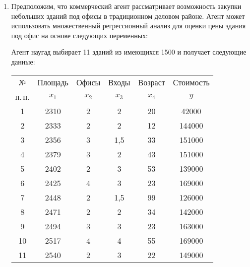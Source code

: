 \documentclass[a4paper,12pt]{extarticle}
\begin{document}
\begin{enumerate}
    \item 
    Предположим, что коммерческий агент рассматривает возможность закупки небольших зданий под офисы в традиционном деловом районе. Агент может использовать множественный регрессионный анализ для оценки цены здания под офис на основе следующих переменных:
    Агент наугад выбирает 11 зданий из имеющихся 1500 и получает следующие данные:
    \par{\centering \begin{tabular}{cccccc}
        \hline
        №     & Площадь & Офисы & Входы & Возраст & Стоимость \\      
        п.\,п.& $x_1$& $x_2$ & $x_3$ & $x_4$ & $y$    \\      
        \hline
        1     & 2310 & 2     & 2     & 20    & 42000  \\
        2     & 2333 & 2     & 2     & 12    & 144000 \\
        3     & 2356 & 3     & 1,5   & 33    & 151000 \\
        4     & 2379 & 3     & 2     & 43    & 151000 \\
        5     & 2402 & 2     & 3     & 53    & 139000 \\
        6     & 2425 & 4     & 3     & 23    & 169000 \\
        7     & 2448 & 2     & 1,5   & 99    & 126000 \\
        8     & 2471 & 2     & 2     & 34    & 142000 \\
        9     & 2494 & 3     & 3     & 23    & 163000 \\
        10    & 2517 & 4     & 4     & 55    & 169000 \\
        11    & 2540 & 2     & 3     & 22    & 149000 \\
        \hline
    \end{tabular}\par}
    

\end{enumerate}
\end{document}
